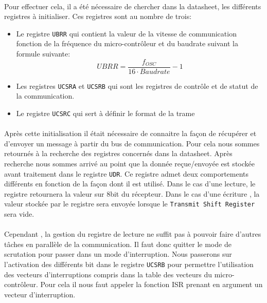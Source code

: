 \paragraph{}
Pour effectuer cela, il a été nécessaire de chercher dans la datasheet, les
différents registres à initialiser. Ces registres sont au nombre de trois:
\begin{itemize}
  \item Le registre \verb!UBRR! qui contient la valeur de la vitesse de communication
    fonction de la fréquence du micro-contrôleur et du baudrate suivant la
    formule suivante:\begin{equation}
      UBRR = \frac{f_{OSC}}{16 \cdot Baudrate} -1
      \label{baudrate}
    \end{equation}
  \item Les registres \verb!UCSRA! et \verb!UCSRB! qui sont les registres de contrôle et de
    statut de la communication.
  \item Le registre \verb!UCSRC! qui sert à définir le format de la trame
\end{itemize}

\paragraph{}
Après cette initialisation il était nécessaire de connaitre la façon de
récupérer et d'envoyer un message à partir du bus de communication. Pour cela
nous sommes retournés à la recherche des registres concernés dans la datasheet.
Après recherche nous sommes arrivé au point que la donnée reçue/envoyée est
stockée avant traitement dans le registre \verb!UDR!. Ce registre admet deux
comportements différents en fonction de la façon dont il est utilisé. Dans le
cas d'une lecture, le registre retournera la valeur sur 8bit du récepteur. Dans
le cas d'une écriture , la valeur stockée par le registre sera envoyée lorsque
le \verb!Transmit Shift Register! sera vide.

\paragraph{}
Cependant , la gestion du registre de lecture ne suffit pas à pouvoir faire
d'autres tâches en parallèle de la communication. Il faut donc quitter le mode
de scrutation pour passer dans un mode d'interruption. Nous passerons sur
l'activation des différents bit dans le registre \verb!UCSRB! pour permettre
l'utilisation des vecteurs d'interruptions compris dans la table des vecteurs du
micro-contrôleur. Pour cela il nous faut appeler la fonction ISR prenant en
argument un vecteur d'interruption. 

